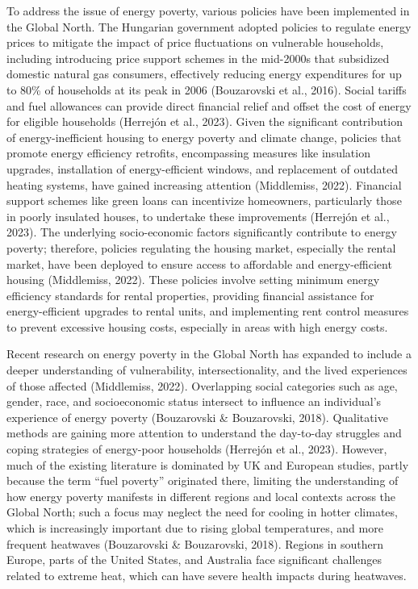 \documentclass[
  twoside,
  openright,
  degree    = master,               %
  language  = english,              %
  fontset   = overleaf,             %
  watermark = true,                 %
  doi       = true,                 %
]{ntuthesis}
\begin{document}
To address the issue of energy poverty, various policies have been
implemented in the Global North. The Hungarian government adopted
policies to regulate energy prices to mitigate the impact of price
fluctuations on vulnerable households, including introducing price
support schemes in the mid-2000s that subsidized domestic natural gas
consumers, effectively reducing energy expenditures for up to 80\% of
households at its peak in 2006 (Bouzarovski et al., 2016). Social
tariffs and fuel allowances can provide direct financial relief and
offset the cost of energy for eligible households (Herrejón et al.,
2023). Given the significant contribution of energy-inefficient housing
to energy poverty and climate change, policies that promote energy
efficiency retrofits, encompassing measures like insulation upgrades,
installation of energy-efficient windows, and replacement of outdated
heating systems, have gained increasing attention (Middlemiss, 2022).
Financial support schemes like green loans can incentivize homeowners,
particularly those in poorly insulated houses, to undertake these
improvements (Herrejón et al., 2023). The underlying socio-economic
factors significantly contribute to energy poverty; therefore, policies
regulating the housing market, especially the rental market, have been
deployed to ensure access to affordable and energy-efficient housing
(Middlemiss, 2022). These policies involve setting minimum energy
efficiency standards for rental properties, providing financial
assistance for energy-efficient upgrades to rental units, and
implementing rent control measures to prevent excessive housing costs,
especially in areas with high energy costs.

Recent research on energy poverty in the Global North has expanded to
include a deeper understanding of vulnerability, intersectionality, and
the lived experiences of those affected (Middlemiss, 2022). Overlapping
social categories such as age, gender, race, and socioeconomic status
intersect to influence an individual's experience of energy poverty
(Bouzarovski \& Bouzarovski, 2018). Qualitative methods are gaining more
attention to understand the day-to-day struggles and coping strategies
of energy-poor households (Herrejón et al., 2023). However, much of the
existing literature is dominated by UK and European studies, partly
because the term ``fuel poverty'' originated there, limiting the
understanding of how energy poverty manifests in different regions and
local contexts across the Global North; such a focus may neglect the
need for cooling in hotter climates, which is increasingly important due
to rising global temperatures, and more frequent heatwaves (Bouzarovski
\& Bouzarovski, 2018). Regions in southern Europe, parts of the United
States, and Australia face significant challenges related to extreme
heat, which can have severe health impacts during heatwaves.
\end{document}
